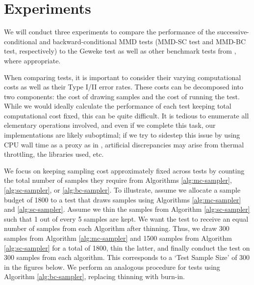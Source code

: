 \documentclass[a4paper,11pt]{article}
\begin{document}
\section{Experiments}
We will conduct three experiments to compare the performance of the successive-conditional and backward-conditional MMD tests (MMD-SC test and MMD-BC test, respectively) to the Geweke test as well as other benchmark tests from \cite{gandy_unit_2020}, where appropriate.

When comparing tests, it is important to consider their varying computational costs as well as their Type I/II error rates. These costs can be decomposed into two components: the cost of drawing samples and the cost of running the test. While we would ideally calculate the performance of each test keeping total computational cost fixed, this can be quite difficult. It is tedious to enumerate all elementary operations involved, and even if we complete this task, our implementations are likely suboptimal; if we try to sidestep this issue by using CPU wall time as a proxy as in \cite{gandy_unit_2020}, artificial discrepancies may arise from thermal throttling, the libraries used, etc. 

We focus on keeping sampling cost approximately fixed across tests by counting the total number of samples they require from Algorithms \ref{alg:mc-sampler}, \ref{alg:sc-sampler}, or \ref{alg:bc-sampler}. To illustrate, assume we allocate a sample budget of 1800 to a test that draws samples using Algorithms \ref{alg:mc-sampler} and \ref{alg:sc-sampler}. Assume we thin the samples from Algorithm \ref{alg:sc-sampler} such that 1 out of every 5 samples are kept. We want the test to receive an equal number of samples from each Algorithm after thinning. Thus, we draw 300 samples from Algorithm \ref{alg:mc-sampler} and 1500 samples from Algorithm \ref{alg:sc-sampler} for a total of 1800, thin the latter, and finally conduct the test on 300 samples from each algorithm. This corresponds to a `Test Sample Size' of 300 in the figures below. We perform an analogous procedure for tests using Algorithm \ref{alg:bc-sampler}, replacing thinning with burn-in.
\end{document}
